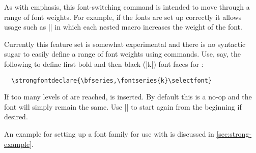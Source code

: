 \documentclass[a4paper]{l3doc}
\begin{document}
As with emphasis, this font-switching command is intended to move through a range
of font weights. For example, if the fonts are set up correctly it allows usage such as
|| in which each nested  macro increases the
weight of the font.

\DescribeMacro{\strongfontdeclare}
Currently this feature set is somewhat experimental and there is no syntactic sugar
to easily define a range of font weights using  commands.
Use, say, the following to define first bold and then black (|k|) font faces for :
\begin{Verbatim}
  \strongfontdeclare{\bfseries,\fontseries{k}\selectfont}
\end{Verbatim}

\DescribeMacro{\strongreset}
If too many levels of  are reached,  is inserted.
By default this is a no-op and the font will simply remain the same.
Use |{\mdseries}| to start again from the beginning if desired.

An example for setting up a font family for use with  is discussed in \vref{sec:strong-example}.
\end{document}
